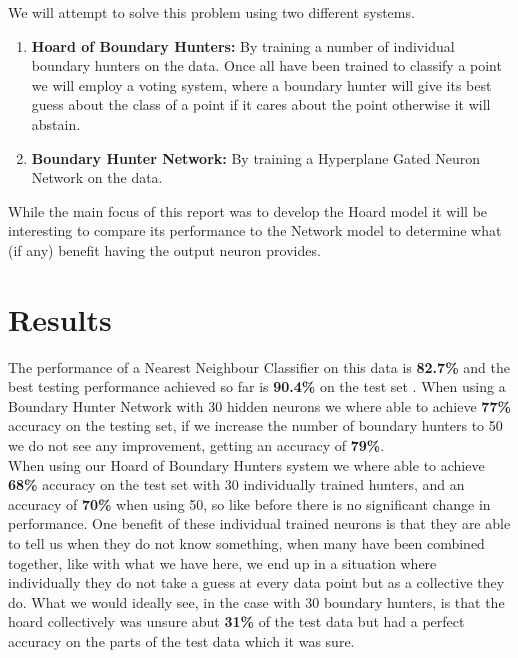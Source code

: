 \documentclass[notitlepage]{report}
\theoremstyle{definition}
\begin{document}
We will attempt to solve this problem using two different systems.

\begin{enumerate}
\item \textbf{Hoard of Boundary Hunters:} By training a number of individual boundary hunters on the data. Once all have been trained to classify a point we will employ a voting system, where a boundary hunter will give its best guess about the class of a point if it cares about the point otherwise it will abstain.

\item \textbf{Boundary Hunter Network:} By training a Hyperplane Gated Neuron Network on the data.
\end{enumerate}

While the main focus of this report was to develop the Hoard model it will be interesting to compare its performance to the Network model to determine what (if any) benefit having the output neuron provides.

\section{Results}
The performance of a Nearest Neighbour Classifier on this data is \textbf{82.7\%} and the best testing performance achieved so far is \textbf{90.4\%} on the test set \cite{gorman1988analysis}. When using a Boundary Hunter Network with 30 hidden neurons we where able to achieve \textbf{77\%} accuracy on the testing set, if we increase the number of boundary hunters to 50 we do not see any improvement, getting an accuracy of \textbf{79\%}.\\

When using our Hoard of Boundary Hunters system we where able to achieve \textbf{68\%} accuracy on the test set with 30 individually trained hunters, and an accuracy of \textbf{70\%} when using 50, so like before there is no significant change in performance. One benefit of these individual trained neurons is that they are able to tell us when they do not know something, when many have been combined together, like with what we have here, we end up in a situation where individually they do not take a guess at every data point but as a collective they do. What we would ideally see, in the case with 30 boundary hunters, is that the hoard collectively was unsure abut \textbf{31\%} of the test data but had a perfect accuracy on the parts of the test data which it was sure.\\
\end{document}
